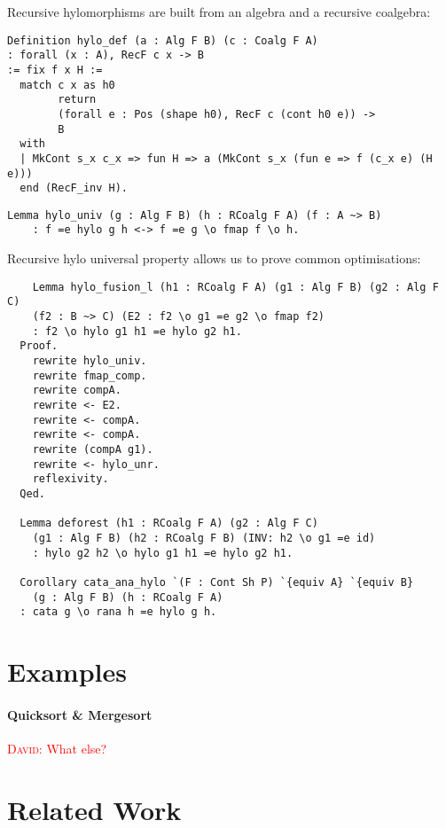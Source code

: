 \documentclass[a4paper, UKenglish, cleveref, autoref, thm-restate]{lipics-v2021}
\newcommand{\dcas}[1]{\textcolor{red}{\textsc{David}: #1}}
\begin{document}
Recursive hylomorphisms are built from an algebra and a recursive coalgebra:
\begin{verbatim}
Definition hylo_def (a : Alg F B) (c : Coalg F A)
: forall (x : A), RecF c x -> B
:= fix f x H :=
  match c x as h0
        return
        (forall e : Pos (shape h0), RecF c (cont h0 e)) ->
        B
  with
  | MkCont s_x c_x => fun H => a (MkCont s_x (fun e => f (c_x e) (H e)))
  end (RecF_inv H).
\end{verbatim}

\begin{verbatim}
Lemma hylo_univ (g : Alg F B) (h : RCoalg F A) (f : A ~> B)
    : f =e hylo g h <-> f =e g \o fmap f \o h.
\end{verbatim}

Recursive hylo universal property allows us to prove common optimisations:

\begin{verbatim}
    Lemma hylo_fusion_l (h1 : RCoalg F A) (g1 : Alg F B) (g2 : Alg F C)
    (f2 : B ~> C) (E2 : f2 \o g1 =e g2 \o fmap f2)
    : f2 \o hylo g1 h1 =e hylo g2 h1.
  Proof.
    rewrite hylo_univ.
    rewrite fmap_comp.
    rewrite compA.
    rewrite <- E2.
    rewrite <- compA.
    rewrite <- compA.
    rewrite (compA g1).
    rewrite <- hylo_unr.
    reflexivity.
  Qed.

  Lemma deforest (h1 : RCoalg F A) (g2 : Alg F C)
    (g1 : Alg F B) (h2 : RCoalg F B) (INV: h2 \o g1 =e id)
    : hylo g2 h2 \o hylo g1 h1 =e hylo g2 h1.

  Corollary cata_ana_hylo `(F : Cont Sh P) `{equiv A} `{equiv B}
    (g : Alg F B) (h : RCoalg F A)
  : cata g \o rana h =e hylo g h.
\end{verbatim}

\section{Examples}

\paragraph{Quicksort \& Mergesort}

\dcas{What else?}


\section{Related Work}
\end{document}
